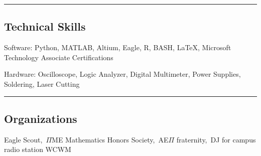 \documentclass[10pt,letterpaper]{article}
\newenvironment{indentsection}[1]%
{\begin{list}{}%
	{\setlength{\leftmargin}{#1}}%
	\item[]%
}
{\end{list}}
\begin{document}
\hrule
\vspace{-0.4em}
\subsection*{Technical Skills}

\begin{description*}
	\item[Software:]
	 Python, MATLAB, Altium, Eagle, R, BASH, \LaTeX, Microsoft Technology Associate Certifications
	\item[Hardware:]
	Oscilloscope, Logic Analyzer, Digital Multimeter, Power Supplies, Soldering, Laser Cutting
\end{description*}

\hrule
\vspace{-0.4em}
\subsection*{Organizations}
\indent Eagle Scout,\, $\Pi$ME Mathematics Honors Society,\, AE$\Pi$ fraternity,\, DJ for campus radio station WCWM
\end{document}
